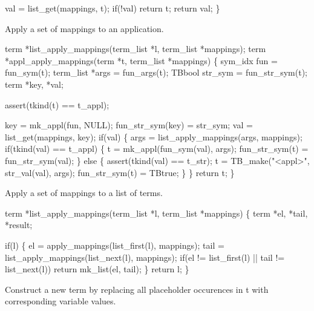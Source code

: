   val = list_get(mappings, t);
  if(!val)
    return t;
  return val;
\}
\nwendcode{}\nwdocspar


Apply a set of mappings to an application.

\nwenddocs{}\endmoddef\let\nwnotused=\nwoutput{}
term *list_apply_mappings(term_list *l, term_list *mappings);
term *appl_apply_mappings(term *t, term_list *mappings)
\{
  sym_idx fun = fun_sym(t);
  term_list *args = fun_args(t);
  TBbool str_sym = fun_str_sym(t);
  term *key, *val;

  assert(tkind(t) == t_appl);

  key = mk_appl(fun, NULL);
  fun_str_sym(key) = str_sym;
  val = list_get(mappings, key);
  if(val) \{
    args = list_apply_mappings(args, mappings);
    if(tkind(val) == t_appl) \{
      t = mk_appl(fun_sym(val), args);
      fun_str_sym(t) = fun_str_sym(val);
    \} else \{
      assert(tkind(val) == t_str);
      t = TB_make("<appl>", str_val(val), args);
      fun_str_sym(t) = TBtrue;      
    \}
  \}
  return t;
\}
\nwendcode{}\nwdocspar


Apply a set of mappings to a list of terms.

\nwenddocs{}\endmoddef\let\nwnotused=\nwoutput{}
term *list_apply_mappings(term_list *l, term_list *mappings)
\{
  term *el, *tail, *result;

  if(l) \{
    el = apply_mappings(list_first(l), mappings);
    tail = list_apply_mappings(list_next(l), mappings);
    if(el != list_first(l) || tail != list_next(l))
      return mk_list(el, tail);
  \}
  return l;
\}
\nwendcode{}\nwdocspar



Construct a new term by replacing all placeholder occurences in t
with corresponding variable values.

